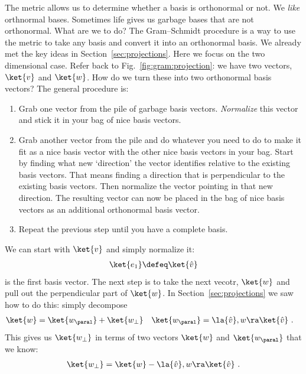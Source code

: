 The metric allows us to determine whether a basis is orthonormal or not. We \emph{like} orthnormal bases. Sometimes life gives us garbage bases that are not orthonormal. What are we to do? The Gram--Schmidt procedure is a way to use the metric to take any basis and convert it into an orthonormal basis. We already met the key ideas in Section~\ref{sec:projections}. Here we focus on the two dimensional case. Refer back to Fig.~\ref{fig:gram:projection}: we have two vectors, $\ket{v}$ and $\ket{w}$. How do we turn these into two orthonormal basis vectors?
%
The general procedure is:
\begin{enumerate}
    \item Grab one vector from the pile of garbage basis vectors. \emph{Normalize} this vector and stick it in your bag of nice basis vectors. 
    \item Grab another vector from the pile and do whatever you need to do to make it fit as a nice basis vector with the other nice basis vectors in your bag. Start by finding what new `direction' the vector identifies relative to the existing basis vectors. That means finding a direction that is perpendicular to the existing basis vectors. Then normalize the vector pointing in that new direction. The resulting vector can now be placed in the bag of nice basis vectors as an additional orthonormal basis vector.
    \item Repeat the previous step until you have a complete basis. 
\end{enumerate}

We can start with $\ket{v}$ and simply normalize it:
\begin{align}
    \ket{{e}_1}\defeq \ket{\hat{v}}
\end{align}
is the first basis vector. The next step is to take the next vecotr, $\ket{w}$ and pull out the perpendicular part of $\ket{w}$. In Section~\ref{sec:projections} we saw how to do this: simply decompose
\begin{align}
    \ket{w} &= \ket{w_\paral} + \ket{w_\perp}
    &
    \ket{w_\paral} &=  \la {\hat v} , w\ra  \ket{\hat v}  \ .
\end{align}
This gives us $\ket{w_\perp}$ in terms of two vectors $\ket{w}$ and $\ket{w_\paral}$ that we know:
\begin{align}
    \ket{w_\perp} = \ket{w} - \la {\hat v} , w \ra  \ket{\hat{v}} \ .
\end{align}

